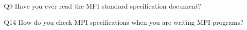 \begin{description}%
\item{Q9} Have you ever read the MPI standard specification document?%
\item{Q14} How do you check MPI specifications when you are writing MPI programs?%
\end{description}%
